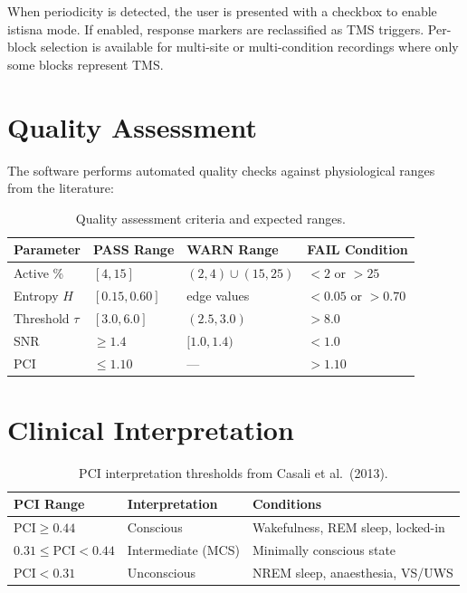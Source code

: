 \documentclass[11pt,a4paper]{article}
\begin{document}
When periodicity is detected, the user is presented with a checkbox to enable istisna mode.
If enabled, response markers are reclassified as TMS triggers. Per-block selection is available
for multi-site or multi-condition recordings where only some blocks represent TMS.

\section{Quality Assessment}
\label{sec:quality}

The software performs automated quality checks against physiological ranges from the literature:

\begin{table}[H]
\centering
\caption{Quality assessment criteria and expected ranges.}
\label{tab:quality}
\begin{tabular}{@{}llll@{}}
\toprule
\textbf{Parameter} & \textbf{PASS Range} & \textbf{WARN Range} & \textbf{FAIL Condition} \\
\midrule
Active \%           & $[4, 15]$           & $(2, 4) \cup (15, 25)$ & $< 2$ or $> 25$ \\
Entropy $H$         & $[0.15, 0.60]$      & edge values            & $< 0.05$ or $> 0.70$ \\
Threshold $\tau$    & $[3.0, 6.0]$        & $(2.5, 3.0)$           & $> 8.0$ \\
SNR                 & $\geq 1.4$          & $[1.0, 1.4)$           & $< 1.0$ \\
PCI                 & $\leq 1.10$         & ---                    & $> 1.10$ \\
\bottomrule
\end{tabular}
\end{table}

\section{Clinical Interpretation}
\label{sec:clinical}

\begin{table}[H]
\centering
\caption{PCI interpretation thresholds from Casali et al.\ (2013).}
\label{tab:thresholds}
\begin{tabular}{@{}lll@{}}
\toprule
\textbf{PCI Range} & \textbf{Interpretation} & \textbf{Conditions} \\
\midrule
$\mathrm{PCI} \geq 0.44$       & Conscious          & Wakefulness, REM sleep, locked-in \\
$0.31 \leq \mathrm{PCI} < 0.44$ & Intermediate (MCS) & Minimally conscious state \\
$\mathrm{PCI} < 0.31$           & Unconscious        & NREM sleep, anaesthesia, VS/UWS \\
\bottomrule
\end{tabular}
\end{table}
\end{document}
